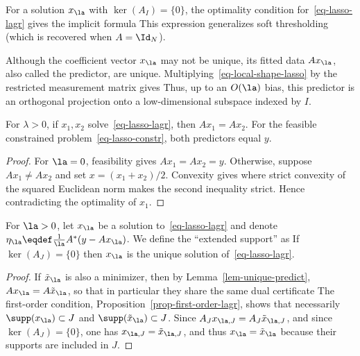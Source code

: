 For a solution $x_\la$ with $\ker(A_I)=\{0\}$, the optimality condition for~\eqref{eq-lasso-lagr} gives the implicit formula
This expression generalizes soft thresholding (which is recovered when $A=\Id_N$).

Although the coefficient vector $x_\la$ may not be unique, its fitted data $Ax_\la$, also called the predictor, are unique.
%
Multiplying~\eqref{eq-local-shape-lasso} by the restricted measurement matrix gives
Thus, up to an $O(\la)$ bias, this predictor is an orthogonal projection onto a low-dimensional subspace indexed by $I$.


\begin{lem}\label{lem-unique-predict}
	For $\lambda>0$, if $x_1,x_2$ solve~\eqref{eq-lasso-lagr}, then $Ax_1=Ax_2$. For the feasible constrained problem~\eqref{eq-lasso-constr}, both predictors equal $y$.
\end{lem}
\begin{proof}
    For $\la=0$, feasibility gives $Ax_1=Ax_2=y$. Otherwise, suppose $Ax_1 \neq Ax_2$ and set $x=(x_1+x_2)/2$. Convexity gives
    where strict convexity of the squared Euclidean norm makes the second inequality strict. Hence
    contradicting the optimality of $x_1$.
\end{proof}


\begin{prop}\label{sec-prop-uniquness-lagr}
 	For $\la>0$, let $x_\la$ be a solution to~\eqref{eq-lasso-lagr} and denote $\eta_\la \eqdef \frac{1}{\la}A^*(y-A x_\la)$.
	We define the ``extended support'' as 
	If $\ker(A_{J})=\{0\}$ then $x_\la$ is the unique solution of~\eqref{eq-lasso-lagr}.
\end{prop}
\begin{proof}
	If $\tilde x_\la$ is also a minimizer, then by Lemma~\ref{lem-unique-predict}, 
	$Ax_\la=A\tilde x_\la$, so that in particular they share the same dual certificate
	The first-order condition, Proposition~\ref{prop-first-order-lagr}, shows that necessarily
	$\supp(x_\la) \subset J$ and $\supp(\tilde x_\la) \subset J$.
	Since $A_J x_{\la,J} = A_J \tilde x_{\la,J}$, and since $\ker(A_J)=\{0\}$, one has 
	$x_{\la,J}=\tilde x_{\la,J}$, and thus $x_\la=\tilde x_\la$ because their supports are included in $J$.
\end{proof}

